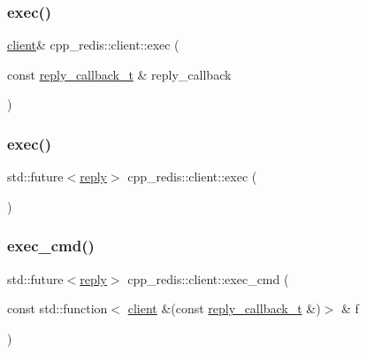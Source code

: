 \mbox{\label{classcpp__redis_1_1client_a76e78829c4ee2e1484268e465fab8997}} 
\subsubsection{\texorpdfstring{exec()}{exec()}\hspace{0.1cm}{\footnotesize\ttfamily [1/2]}}
{\footnotesize\ttfamily \hyperlink{classcpp__redis_1_1client}{client}\& cpp\+\_\+redis\+::client\+::exec (\begin{DoxyParamCaption}\item[{const \hyperlink{classcpp__redis_1_1client_a061a1140d36d2eaeda82b09a0bb3f9f2}{reply\+\_\+callback\+\_\+t} \&}]{reply\+\_\+callback }\end{DoxyParamCaption})}

\mbox{\label{classcpp__redis_1_1client_a93c5b232ae13b5107b6aa1ea5f70b70d}} 
\subsubsection{\texorpdfstring{exec()}{exec()}\hspace{0.1cm}{\footnotesize\ttfamily [2/2]}}
{\footnotesize\ttfamily std\+::future$<$\hyperlink{classcpp__redis_1_1reply}{reply}$>$ cpp\+\_\+redis\+::client\+::exec (\begin{DoxyParamCaption}{ }\end{DoxyParamCaption})}

\mbox{\label{classcpp__redis_1_1client_a3097bc84df061096c553cb5b03d85f0a}} 
\subsubsection{\texorpdfstring{exec\+\_\+cmd()}{exec\_cmd()}}
{\footnotesize\ttfamily std\+::future$<$\hyperlink{classcpp__redis_1_1reply}{reply}$>$ cpp\+\_\+redis\+::client\+::exec\+\_\+cmd (\begin{DoxyParamCaption}\item[{const std\+::function$<$ \hyperlink{classcpp__redis_1_1client}{client} \&(const \hyperlink{classcpp__redis_1_1client_a061a1140d36d2eaeda82b09a0bb3f9f2}{reply\+\_\+callback\+\_\+t} \&)$>$ \&}]{f }\end{DoxyParamCaption})\hspace{0.3cm}{\ttfamily [private]}}



